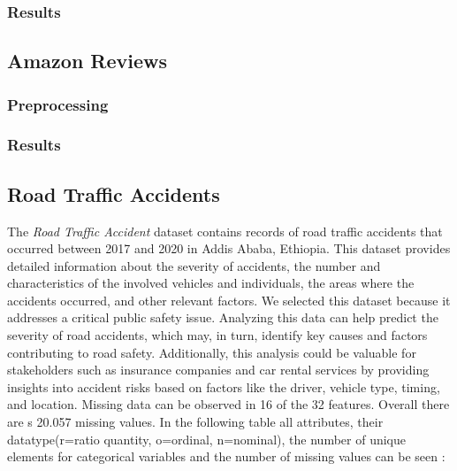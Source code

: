 \documentclass{article}
\begin{document}
\subsubsection{Results}

\subsection{Amazon Reviews}
\subsubsection{Preprocessing}
\subsubsection{Results}

\subsection{Road Traffic Accidents}
The \textit{Road Traffic Accident} dataset contains records of road traffic accidents that occurred between 2017 and 2020 in Addis Ababa, Ethiopia. This dataset provides detailed information about the severity of accidents, the number and characteristics of the involved vehicles and individuals, the areas where the accidents occurred, and other relevant factors.
We selected this dataset because it addresses a critical public safety issue. Analyzing this data can help predict the severity of road accidents, which may, in turn, identify key causes and factors contributing to road safety. Additionally, this analysis could be valuable for stakeholders such as insurance companies and car rental services by providing insights into accident risks based on factors like the driver, vehicle type, timing, and location.
\newline
Missing data can be observed in 16 of the 32 features. Overall there are s 20.057 missing values. In the following table all attributes, their datatype(r=ratio quantity, o=ordinal, n=nominal), the number of unique elements for categorical variables and the number of missing values can be seen :
\setlength{\tabcolsep}{1pt} %
\end{document}
